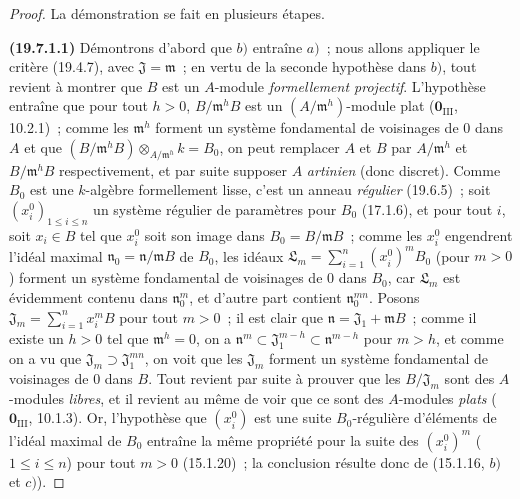 \begin{proof}
La démonstration se fait en plusieurs étapes.

\medskip
\noindent{}\label{0.19.7.1.1-fr}\textbf{(19.7.1.1)}\enspace
Démontrons d'abord que $b)$ entraîne $a)$~; nous allons appliquer le critère
(19.4.7), avec $\mathfrak J=\mathfrak m$~; en vertu de la seconde hypothèse
dans $b)$, tout revient à montrer que $B$ est un $A$-module
\emph{formellement projectif}. L'hypothèse entraîne que pour tout $h>0$,
$B/\mathfrak m^hB$ est un $(A/\mathfrak m^h)$-module plat
($\mathbf 0_{\mathrm{III}}$, 10.2.1)~; comme les $\mathfrak m^h$ forment un
système fondamental de voisinages de 0 dans $A$ et que
$(B/\mathfrak m^hB)\otimes_{A/\mathfrak m^h}k=B_0$, on peut remplacer $A$ et
$B$ par $A/\mathfrak m^h$ et $B/\mathfrak m^hB$ respectivement, et par suite
supposer $A$ \emph{artinien} (donc discret). Comme $B_0$ est une $k$-algèbre
formellement lisse, c'est un anneau \emph{régulier} (19.6.5)~; soit
$(x_i^0)_{1\leq i\leq n}$ un système régulier de paramètres pour $B_0$
(17.1.6), et pour tout $i$, soit $x_i\in B$ tel que $x_i^0$ soit son image
dans $B_0=B/\mathfrak mB$~; comme les $x_i^0$ engendrent l'idéal maximal
$\mathfrak n_0=\mathfrak n/\mathfrak mB$ de $B_0$, les idéaux
$\mathfrak L_m=\sum_{i=1}^n(x_i^0)^mB_0$ (pour $m>0$)
forment un système fondamental de voisinages de 0 dans $B_0$, car
$\mathfrak L_m$ est évidemment contenu dans $\mathfrak n_0^m$, et d'autre
part contient $\mathfrak n_0^{mn}$. Posons
$\mathfrak J_m=\sum_{i=1}^n x_i^mB$ pour tout $m>0$~; il est clair que
$\mathfrak n=\mathfrak J_1+\mathfrak mB$~; comme il existe un $h>0$ tel que
$\mathfrak m^h=0$, on a
$\mathfrak n^m\subset\mathfrak J_1^{m-h}\subset\mathfrak n^{m-h}$ pour
$m>h$, et comme on a vu que $\mathfrak J_m\supset\mathfrak J_1^{mn}$, on voit
que les $\mathfrak J_m$ forment un système fondamental de voisinages de 0 dans
$B$. Tout revient par suite à prouver que les $B/\mathfrak J_m$ sont des
$A$-modules \emph{libres}, et il revient au même de voir que ce sont des
$A$-modules \emph{plats} ($\mathbf 0_{\mathrm{III}}$, 10.1.3). Or,
l'hypothèse que $(x_i^0)$ est une suite $B_0$-régulière d'éléments de l'idéal
maximal de $B_0$ entraîne la même propriété pour la suite des $(x_i^0)^m$
($1\leq i\leq n$) pour tout $m>0$ (15.1.20)~; la conclusion résulte donc de
(15.1.16, $b)$ et $c)$).
\end{proof}

